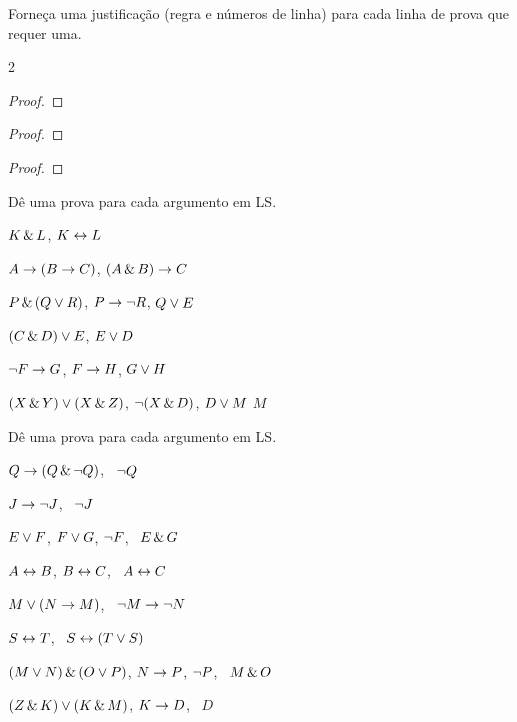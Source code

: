 \solutions
\problempart
\label{pr.justifyLSproof}
Forneça uma justificação (regra e números de linha) para cada linha de prova que requer uma.
\begin{multicols}{2}
\begin{proof}
 {}
 {}
\end{proof}

\begin{proof}
\open
\close
{}
\end{proof}

\begin{proof}
\open
	 {}
	\open
	\close
\close
{}
\end{proof}
\end{multicols}

\solutions
\problempart
\label{pr.solvedSLproofs}
Dê uma prova para cada argumento em LS.
\begin{earg}
\item $K\,\&\, L$, \therefore $K\leftrightarrow L$
\item $A\rightarrow (B\rightarrow C)$, \therefore $(A\,\&\, B)\rightarrow C$
\item $P \,\&\, (Q\vee R)$, $P\rightarrow \neg R$, \therefore $Q\vee E$
\item $(C\,\&\, D)\vee E$, \therefore $E\vee D$
\item $\neg F\rightarrow G$, $F\rightarrow H$, \therefore $G\vee H$
\item $(X\,\&\, Y)\vee(X\,\&\, Z)$, $\neg(X\,\&\, D)$, $D\vee M$ \therefore $M$
\end{earg}

\problempart
Dê uma prova para cada argumento em LS.
\begin{earg}
\item $Q\rightarrow(Q\,\&\,\neg Q)$, \therefore\ $\neg Q$
\item $J\rightarrow\neg J$, \therefore\ $\neg J$
\item $E\vee F$, $F\vee G$, $\neg F$, \therefore\ $E \,\&\, G$
\item $A\leftrightarrow B$, $B\leftrightarrow C$, \therefore\ $A\leftrightarrow C$
\item $M\vee(N\rightarrow M)$, \therefore\ $\neg M \rightarrow \neg N$
\item $S\leftrightarrow T$, \therefore\ $S\leftrightarrow (T\vee S)$
\item $(M \vee N) \,\&\, (O \vee P)$, $N \rightarrow P$, $\neg P$, \therefore\ $M\,\&\, O$
\item $(Z\,\&\, K) \vee (K\,\&\, M)$, $K \rightarrow D$, \therefore\ $D$
\end{earg}



